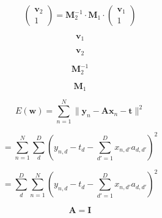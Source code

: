 \documentclass[10pt,twoside]{book}
\newcommand{\fat}[1]{\mathbf{#1}} %
\begin{document}

$$
\left(
\begin{array}{c}
\fat{v}_{2} \\
1 
\end{array}
\right)
=
\fat{M}_{2}^{-1}
\cdot
\fat{M}_{1}
\cdot
\left(
\begin{array}{c}
\fat{v}_{1} \\
1 
\end{array}
\right)
$$

$$
\fat{v}_1
$$

$$
\fat{v}_2
$$

$$
\fat{M}_{2}^{-1}
$$

$$
\fat{M}_{1}
$$


$$
E(\fat{w}) 
=
\sum_{n=1}^N \| \fat{y}_n - \fat{A} \fat{x}_n - \fat{t} \|^2
$$


$$
=
\sum_{n=1}^N \sum_{d}^D ( y_{n,d} - t_d - \sum_{d'=1}^D x_{n,d'} a_{d,d'} )^2
$$

$$
=
\sum_{d}^D \sum_{n=1}^N ( y_{n,d} - t_d - \sum_{d'=1}^D x_{n,d'} a_{d,d'} )^2
$$


$$
\fat{A} = \fat{I}
$$
\end{document}
